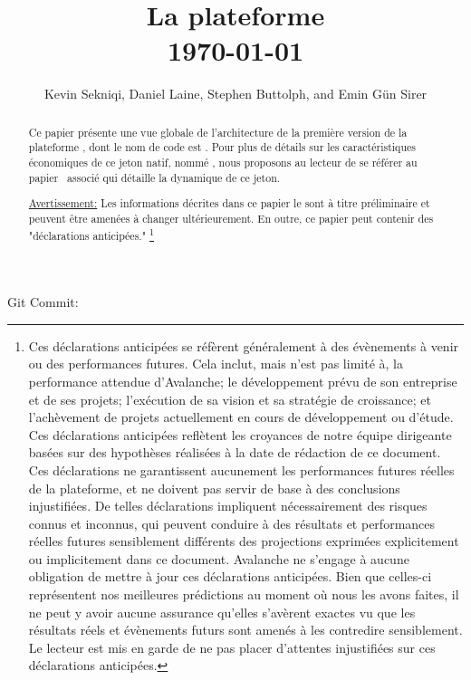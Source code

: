 \documentclass[runningheads]{llncs}
\begin{document}
\immediate{}

\title{La plateforme \AVAPlatformName{}\\\today}
\author{Kevin Sekniqi, Daniel Laine, Stephen Buttolph, and Emin G{\"u}n Sirer}
\institute{}

\maketitle

\begin{abstract}
Ce papier présente une vue globale de l'architecture de la première version de la plateforme \AVAPlatformName{}, dont
le nom de code est \AVAPlatformNameFirstRelease{}. Pour plus de détails sur les caractéristiques économiques de ce
jeton natif, nommé \AVATokenName{}, nous proposons au lecteur de se référer au papier~\cite{avatokenpaper} associé qui
détaille la dynamique de ce jeton.

\underline{Avertissement:} Les informations décrites dans ce papier le sont à titre préliminaire et peuvent être
amenées à changer ultérieurement. En outre, ce papier peut contenir des "déclarations anticipées."
\footnote{Ces déclarations anticipées se réfèrent généralement à des évènements à venir ou des performances futures.
Cela inclut, mais n'est pas limité à, la performance attendue d'Avalanche; le développement prévu de son entreprise et
de ses projets; l'exécution de sa vision et sa stratégie de croissance; et l'achèvement de projets actuellement en
cours de développement ou d'étude. Ces déclarations anticipées reflètent les croyances de notre équipe dirigeante
basées sur des hypothèses réalisées à la date de rédaction de ce document. Ces déclarations ne garantissent aucunement
les performances futures réelles de la plateforme, et ne doivent pas servir de base à des conclusions injustifiées. De
telles déclarations impliquent nécessairement des risques connus et inconnus, qui peuvent conduire à des résultats et
performances réelles futures sensiblement différents des projections exprimées explicitement ou implicitement dans ce
document. Avalanche ne s'engage à aucune obligation de mettre à jour ces déclarations anticipées. Bien que celles-ci
représentent nos meilleures prédictions au moment où nous les avons faites, il ne peut y avoir aucune assurance qu'elles
s'avèrent exactes vu que les résultats réels et évènements futurs sont amenés à les contredire sensiblement. Le lecteur
est mis en garde de ne pas placer d'attentes injustifiées sur ces déclarations anticipées.}

\end{abstract}
\begin{center}
    \scriptsize Git Commit: 
 \end{center}
\end{document}
